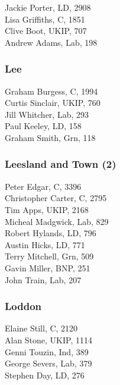 \documentclass[a4paper,openany,10pt]{book}
\begin{document}


Jackie Porter, LD, 2908\\
Lisa Griffiths, C, 1851\\
Clive Boot, UKIP, 707\\
Andrew Adams, Lab, 198\\


\subsubsection*{Lee}



Graham Burgess, C, 1994\\
Curtis Sinclair, UKIP, 760\\
Jill Whitcher, Lab, 293\\
Paul Keeley, LD, 158\\
Graham Smith, Grn, 118\\


\subsubsection*{Leesland and Town (2)}



Peter Edgar, C, 3396\\
Christopher Carter, C, 2795\\
Tim Apps, UKIP, 2168\\
Micheal Madgwick, Lab, 829\\
Robert Hylands, LD, 796\\
Austin Hicks, LD, 771\\
Terry Mitchell, Grn, 509\\
Gavin Miller, BNP, 251\\
John Train, Lab, 207\\


\subsubsection*{Loddon}



Elaine Still, C, 2120\\
Alan Stone, UKIP, 1114\\
Genni Touzin, Ind, 389\\
George Severs, Lab, 379\\
Stephen Day, LD, 276\\
\end{document}
